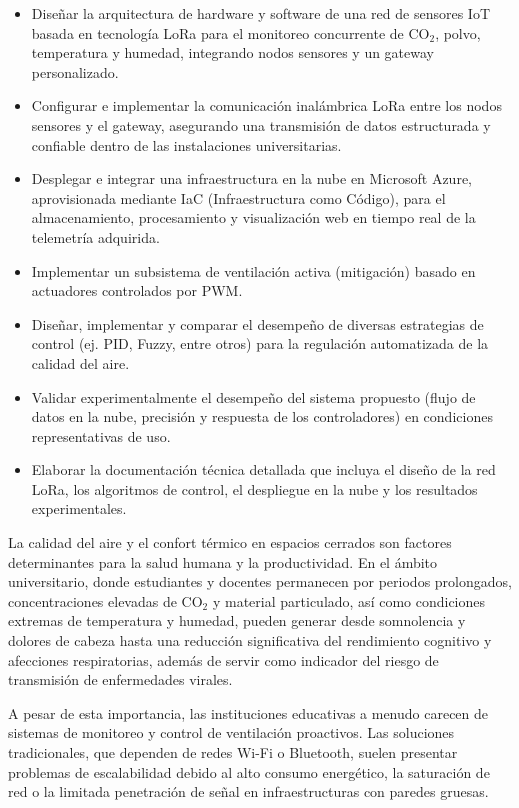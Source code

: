 \begin{itemize}
    \item Diseñar la arquitectura de hardware y software de una red de sensores IoT basada en tecnología LoRa para el monitoreo concurrente de CO\(_2\), polvo, temperatura y humedad, integrando nodos sensores y un gateway personalizado.
    \item Configurar e implementar la comunicación inalámbrica LoRa entre los nodos sensores y el gateway, asegurando una transmisión de datos estructurada y confiable dentro de las instalaciones universitarias.
    \item Desplegar e integrar una infraestructura en la nube en Microsoft Azure, aprovisionada mediante IaC (Infraestructura como Código), para el almacenamiento, procesamiento y visualización web en tiempo real de la telemetría adquirida.
    \item Implementar un subsistema de ventilación activa (mitigación) basado en actuadores controlados por PWM.
    \item Diseñar, implementar y comparar el desempeño de diversas estrategias de control (ej. PID, Fuzzy, entre otros) para la regulación automatizada de la calidad del aire.
    \item Validar experimentalmente el desempeño del sistema propuesto (flujo de datos en la nube, precisión y respuesta de los controladores) en condiciones representativas de uso.
    \item Elaborar la documentación técnica detallada que incluya el diseño de la red LoRa, los algoritmos de control, el despliegue en la nube y los resultados experimentales.

\end{itemize}



La calidad del aire y el confort térmico en espacios cerrados son factores determinantes para la salud humana y la productividad. En el ámbito universitario, donde estudiantes y docentes permanecen por periodos prolongados, concentraciones elevadas de CO\(_2\) y material particulado, así como condiciones extremas de temperatura y humedad, pueden generar desde somnolencia y dolores de cabeza hasta una reducción significativa del rendimiento cognitivo y afecciones respiratorias, además de servir como indicador del riesgo de transmisión de enfermedades virales.

A pesar de esta importancia, las instituciones educativas a menudo carecen de sistemas de monitoreo y control de ventilación proactivos. Las soluciones tradicionales, que dependen de redes Wi-Fi o Bluetooth, suelen presentar problemas de escalabilidad debido al alto consumo energético, la saturación de red o la limitada penetración de señal en infraestructuras con paredes gruesas.

